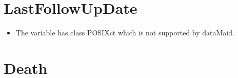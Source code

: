 \documentclass[]{report}
\providecommand{\tightlist}{%
  \setlength{\itemsep}{0pt}\setlength{\parskip}{0pt}}
\begin{document}
\noindent\makebox[\linewidth]{\rule{\textwidth}{0.4pt}}

\hypertarget{lastfollowupdate}{%
\section{LastFollowUpDate}\label{lastfollowupdate}}

\begin{itemize}
\tightlist
\item
  The variable has class POSIXct which is not supported by dataMaid.
\end{itemize}

\noindent\makebox[\linewidth]{\rule{\textwidth}{0.4pt}}

\hypertarget{death}{%
\section{Death}\label{death}}
\end{document}
